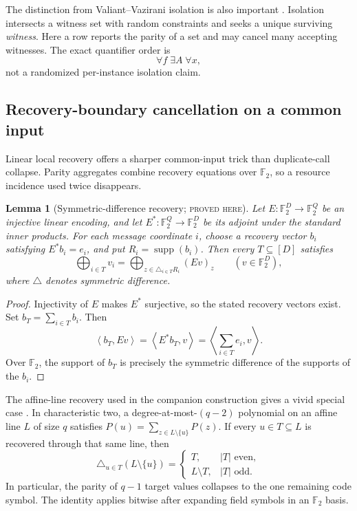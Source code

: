 \documentclass[11pt]{article}
\newtheorem{lemma}[lemma]{Lemma}
\theoremstyle{definition}
\theoremstyle{remark}
\newcommand{\F}{\mathbb F}
\newcommand{\supp}{\operatorname{supp}}
\newcommand{\status}[1]{\textsc{#1}}
\begin{document}
The distinction from Valiant--Vazirani isolation is also important
\cite{ValiantVazirani1986}.  Isolation intersects a witness set with random
constraints and seeks a unique surviving \emph{witness}.  Here a row reports
the parity of a set and may cancel many accepting witnesses.  The exact
quantifier order is
\[
  \forall f\;\exists A\;\forall x,
\]
not a randomized per-instance isolation claim.

\subsection{Recovery-boundary cancellation on a common input}
\label{sec:recovery-cancellation}

Linear local recovery offers a sharper common-input trick than duplicate-call
collapse.  Parity aggregates combine recovery equations over $\F_2$, so a
resource incidence used twice disappears.

\begin{lemma}[Symmetric-difference recovery; \status{proved here}]
\label{lem:symmetric-difference}
Let $E:\F_2^D\to\F_2^Q$ be an injective linear encoding, and let
$E^*:\F_2^Q\to\F_2^D$ be its adjoint under the standard inner products.  For
each message coordinate $i$, choose a recovery vector $b_i$ satisfying
$E^*b_i=e_i$, and put $R_i=\supp(b_i)$.  Then every $T\subseteq[D]$ satisfies
\[
  \bigoplus_{i\in T}v_i
  =\bigoplus_{z\in\triangle_{i\in T}R_i}(Ev)_z
  \qquad(v\in\F_2^D),
  \tag{4.7}\label{eq:symmetric-difference}
\]
where $\triangle$ denotes symmetric difference.
\end{lemma}

\begin{proof}
Injectivity of $E$ makes $E^*$ surjective, so the stated recovery vectors
exist.  Set $b_T=\sum_{i\in T}b_i$.  Then
\[
  \left\langle b_T,Ev\right\rangle
  =\left\langle E^*b_T,v\right\rangle
  =\left\langle\sum_{i\in T}e_i,v\right\rangle.
\]
Over $\F_2$, the support of $b_T$ is precisely the symmetric difference of
the supports of the $b_i$.
\end{proof}

The affine-line recovery used in the companion construction gives a vivid
special case \cite[Section~4]{Schlesinger2026}.  In characteristic two, a
degree-at-most-$(q-2)$ polynomial on an affine line $L$ of size $q$ satisfies
$P(u)=\sum_{z\in L\setminus\{u\}}P(z)$.  If every $u\in T\subseteq L$ is
recovered through that same line, then
\[
  \triangle_{u\in T}(L\setminus\{u\})
  =
  \begin{cases}
    T,&|T|\text{ even},\\
    L\setminus T,&|T|\text{ odd}.
  \end{cases}
  \tag{4.8}\label{eq:line-cancellation}
\]
In particular, the parity of $q-1$ target values collapses to the one
remaining code symbol.  The identity applies bitwise after expanding field
symbols in an $\F_2$ basis.
\end{document}
